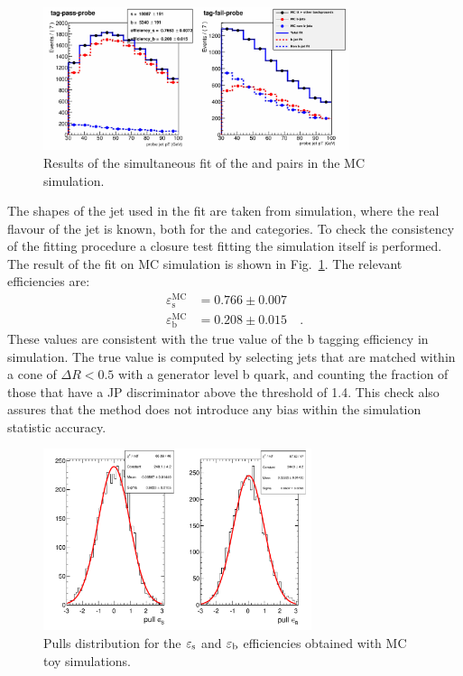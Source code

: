\begin{figure}[!htb]
\centering
\includegraphics[width=0.8\textwidth]{images/mc_pt_probe-v2.pdf}
\caption{Results of the simultaneous fit of the \tpp and \tfp pairs in the MC simulation.\label{fig:mc_tp}}
\end{figure}

The \pt shapes of the \probe jet used in the fit are taken from simulation, where the real flavour of the jet is known, both for the \tpp and \tfp categories. To check the consistency of the fitting procedure a closure test fitting the simulation itself is performed.
The result of the fit on MC simulation is shown in Fig.~\ref{fig:mc_tp}. The relevant efficiencies are:
\begin{equation}
\begin{split}
\varepsilon_\mathrm{s}^\mathrm{MC} &= 0.766\pm0.007 \\
\varepsilon_\mathrm{b}^\mathrm{MC} &= 0.208\pm0.015 \quad .
\end{split}
\end{equation}
These values are consistent with the true value of the b tagging efficiency in simulation. The true value is computed by selecting jets that are matched within a cone of $\Delta{R}<0.5$ with a generator level b quark, and counting the fraction of those that have a JP discriminator above the threshold of 1.4. This check also assures that the \tp method does not introduce any bias within the simulation statistic accuracy.

\begin{figure}[htb]
\centering
\includegraphics[width=0.7\textwidth]{images/pulls_mc.pdf}
\caption{Pulls distribution for the $\varepsilon_{\rm s}$ and $\varepsilon_{\rm b}$ efficiencies obtained with MC toy simulations.\label{fig:pullstp}}
\end{figure}

